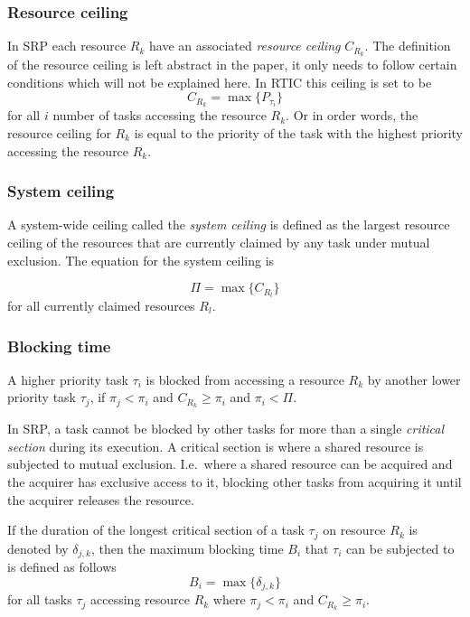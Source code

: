 \subsubsection{Resource ceiling}
\label{theory:srp:definitions:resource}
In SRP each resource $R_k$ have an associated \emph{resource ceiling}
$C_{R_k}$. The definition of the resource ceiling is left abstract in the
paper, it only needs to follow certain conditions which will not be explained
here. In RTIC this ceiling is set to be
\begin{equation}
    C_{R_k} = \max\{P_{\tau_i}\}
\end{equation}
for all $i$ number of tasks accessing the resource $R_k$. Or in order words,
the resource ceiling for $R_k$ is equal to the priority of the task with the
highest priority accessing the resource $R_k$.

\subsubsection{System ceiling}
\label{theory:srp:definitions:system}
A system-wide ceiling called the \emph{system ceiling} is defined as the
largest resource ceiling of the resources that are currently claimed by
any task under mutual exclusion. The equation for the system ceiling is

\begin{equation}
    \Pi = \max\{C_{R_l}\}
\end{equation}
for all currently claimed resources $R_l$.

\subsubsection{Blocking time}
\label{theory:srp:definitions:blocking}
A higher priority task $\tau_i$ is blocked from accessing a resource $R_k$ by
another lower priority task $\tau_j$, if $\pi_j < \pi_i$ and $C_{R_k} \geq
\pi_i$ and $\pi_i < \Pi$. %

In SRP, a task cannot be blocked by other tasks for more than a single
\emph{critical section} during its execution. A critical section is where a
shared resource is subjected to mutual exclusion. I.e.\ where a shared resource
can be acquired and the acquirer has exclusive access to it, blocking other
tasks from acquiring it until the acquirer releases the resource.

If the duration of the longest critical section of a task $\tau_j$ on resource
$R_k$ is denoted by $\delta_{j,k}$, then the maximum blocking time $B_i$
that $\tau_i$ can be subjected to is defined as follows
\begin{equation}
    B_i = \max\{\delta_{j,k}\}
\end{equation}
for all tasks $\tau_j$ accessing resource $R_k$ where $\pi_j < \pi_i$ and
$C_{R_k} \geq \pi_i$.

